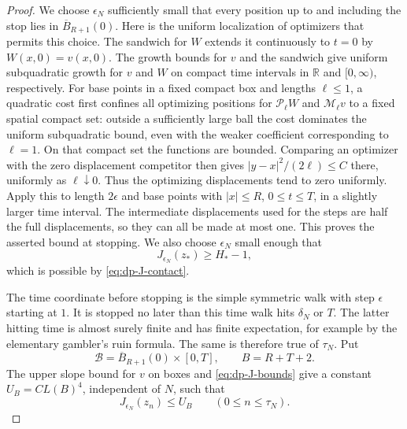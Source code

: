 \documentclass[11pt]{article}
\numberwithin{equation}{section}
\theoremstyle{definition}
\theoremstyle{remark}
\newcommand{\R}{\mathbb{R}}
\newcommand{\Penv}{\mathcal{P}}
\newcommand{\Menv}{\mathcal{M}}
\begin{document}
\begin{proof}
We choose $\epsilon_N$ sufficiently small that every position up to and
including the stop lies in $\overline B_{R+1}(0)$.  Here is the uniform
localization of optimizers that permits this choice.  The sandwich for $W$
extends it continuously to $t=0$ by $W(x,0)=v(x,0)$.  The growth bounds for
$v$ and the sandwich give uniform subquadratic growth for $v$ and $W$ on
compact time intervals in $\R$ and $[0,\infty)$, respectively.  For base
points in a fixed compact box and lengths
$\ell\le1$, a quadratic cost first confines all optimizing positions for
$\Penv_\ell W$ and $\Menv_\ell v$ to a fixed spatial compact set: outside a
sufficiently large ball the cost dominates the uniform subquadratic bound,
even with the weaker coefficient corresponding to $\ell=1$.  On that compact
set the functions are bounded.  Comparing an optimizer with the zero
displacement competitor then gives $|y-x|^2/(2\ell)\le C$ there, uniformly
as $\ell\downarrow0$.  Thus the optimizing displacements tend to zero
uniformly.  Apply this to length $2\epsilon$ and base points with
$|x|\le R$, $0\le t\le T$, in a slightly larger time interval.  The
intermediate displacements used for the steps are half the full
displacements, so they can all be made at most one.  This proves the asserted
bound at stopping.  We also choose $\epsilon_N$ small enough that
\begin{equation}\label{eq:contact-start-lower}
  J_{\epsilon_N}(z_*)\ge H_*-1,
\end{equation}
which is possible by \eqref{eq:dp-J-contact}.

The time coordinate before stopping is the simple symmetric walk with step
$\epsilon$ starting at $1$.  It is stopped no later than this time walk hits
$\delta_N$ or $T$.  The latter hitting time is almost surely finite and has
finite expectation, for example by the elementary gambler's ruin formula.
The same is therefore true of $\tau_N$.  Put
\[
  \mathcal B=\overline B_{R+1}(0)\times[0,T],\qquad B=R+T+2.
\]
The upper slope bound for $v$ on boxes and \eqref{eq:dp-J-bounds} give a
constant $U_B=C L(B)^4$, independent of $N$, such that
\begin{equation}\label{eq:contact-J-upper}
  J_{\epsilon_N}(z_n)\le U_B\qquad (0\le n\le\tau_N).
\end{equation}


\end{proof}
\end{document}
